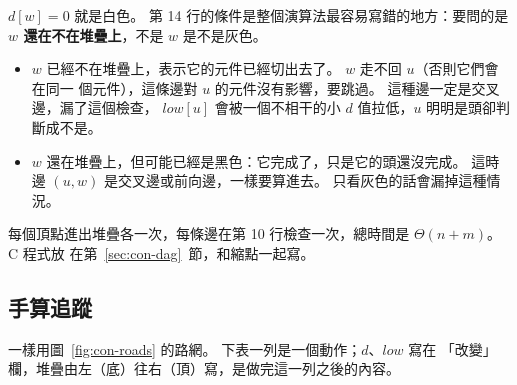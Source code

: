 $d[w] = 0$ 就是白色。 第 14 行的條件是整個演算法最容易寫錯的地方：要問的是
\textbf{$w$ 還在不在堆疊上}，不是 $w$ 是不是灰色。

\begin{itemize}
\item $w$ 已經不在堆疊上，表示它的元件已經切出去了。 $w$ 走不回 $u$（否則它們會在同一
個元件），這條邊對 $u$ 的元件沒有影響，要跳過。 這種邊一定是交叉邊，漏了這個檢查，
$\mathit{low}[u]$ 會被一個不相干的小 $d$ 值拉低，$u$ 明明是頭卻判斷成不是。
\item $w$ 還在堆疊上，但可能已經是黑色：它完成了，只是它的頭還沒完成。 這時邊 $(u, w)$
是交叉邊或前向邊，一樣要算進去。 只看灰色的話會漏掉這種情況。
\end{itemize}

每個頂點進出堆疊各一次，每條邊在第 10 行檢查一次，總時間是 $\Theta(n + m)$。 C 程式放
在第~\ref{sec:con-dag}~節，和縮點一起寫。

\subsection{手算追蹤}

一樣用圖~\ref{fig:con-roads} 的路網。 下表一列是一個動作；$d$、$\mathit{low}$ 寫在
「改變」欄，堆疊由左（底）往右（頂）寫，是做完這一列之後的內容。

